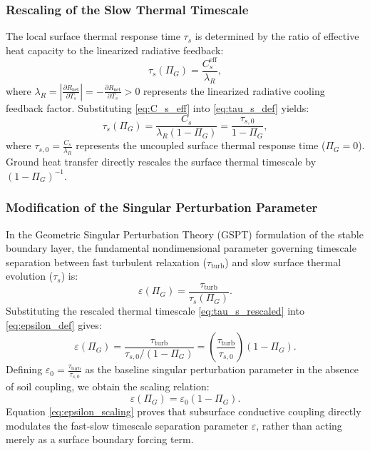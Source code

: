 \documentclass[11pt]{article}
\begin{document}
\subsubsection{Rescaling of the Slow Thermal Timescale}
The local surface thermal response time $\tau_s$ is determined by the ratio of effective heat capacity to the linearized radiative feedback:
\begin{equation}
\tau_s(\Pi_G) = \frac{C_s^{\text{eff}}}{\lambda_R},
\label{eq:tau_s_def}
\end{equation}
where $\lambda_R = \left| \frac{\partial R_{\text{net}}}{\partial T_s} \right| = -\frac{\partial R_{\text{net}}}{\partial T_s} > 0$ represents the linearized radiative cooling feedback factor. Substituting \eqref{eq:C_s_eff} into \eqref{eq:tau_s_def} yields:
\begin{equation}
\tau_s(\Pi_G) = \frac{C_s}{\lambda_R (1 - \Pi_G)} = \frac{\tau_{s,0}}{1 - \Pi_G},
\label{eq:tau_s_rescaled}
\end{equation}
where $\tau_{s,0} = \frac{C_s}{\lambda_R}$ represents the uncoupled surface thermal response time ($\Pi_G = 0$). Ground heat transfer directly rescales the surface thermal timescale by $(1 - \Pi_G)^{-1}$.

\subsubsection{Modification of the Singular Perturbation Parameter}
In the Geometric Singular Perturbation Theory (GSPT) formulation of the stable boundary layer, the fundamental nondimensional parameter governing timescale separation between fast turbulent relaxation ($\tau_{\text{turb}}$) and slow surface thermal evolution ($\tau_s$) is:
\begin{equation}
\varepsilon(\Pi_G) = \frac{\tau_{\text{turb}}}{\tau_s(\Pi_G)}.
\label{eq:epsilon_def}
\end{equation}
Substituting the rescaled thermal timescale \eqref{eq:tau_s_rescaled} into \eqref{eq:epsilon_def} gives:
\begin{equation}
\varepsilon(\Pi_G) = \frac{\tau_{\text{turb}}}{\tau_{s,0} / (1 - \Pi_G)} = \left( \frac{\tau_{\text{turb}}}{\tau_{s,0}} \right) (1 - \Pi_G).
\label{eq:epsilon_derivation}
\end{equation}
Defining $\varepsilon_0 = \frac{\tau_{\text{turb}}}{\tau_{s,0}}$ as the baseline singular perturbation parameter in the absence of soil coupling, we obtain the scaling relation:
\begin{equation}
\varepsilon(\Pi_G) = \varepsilon_0 (1 - \Pi_G).
\label{eq:epsilon_scaling}
\end{equation}
Equation \eqref{eq:epsilon_scaling} proves that subsurface conductive coupling directly modulates the fast-slow timescale separation parameter $\varepsilon$, rather than acting merely as a surface boundary forcing term.
\end{document}
